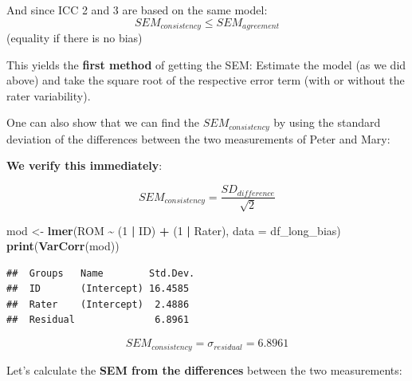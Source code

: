 \documentclass[
]{article}
\newenvironment{Shaded}{\begin{snugshade}}{\end{snugshade}}
\newcommand{\AttributeTok}[1]{\textcolor[rgb]{0.13,0.29,0.53}{#1}}
\newcommand{\CommentTok}[1]{\textcolor[rgb]{0.56,0.35,0.01}{\textit{#1}}}
\newcommand{\DecValTok}[1]{\textcolor[rgb]{0.00,0.00,0.81}{#1}}
\newcommand{\FunctionTok}[1]{\textcolor[rgb]{0.13,0.29,0.53}{\textbf{#1}}}
\newcommand{\NormalTok}[1]{#1}
\newcommand{\OtherTok}[1]{\textcolor[rgb]{0.56,0.35,0.01}{#1}}
\newcommand{\SpecialCharTok}[1]{\textcolor[rgb]{0.81,0.36,0.00}{\textbf{#1}}}
\newcommand{\StringTok}[1]{\textcolor[rgb]{0.31,0.60,0.02}{#1}}
\begin{document}
And since ICC 2 and 3 are based on the same model:
\[SEM_{consistency} \le SEM_{agreement}\]
(equality if there is no bias)

This yields the \textbf{first method} of getting the SEM: Estimate the
model (as we did above) and take the square root of the respective error term
(with or without the rater variability).

One can also show that we can find the \(SEM_{consistency}\) by using
the standard deviation of the differences between the two measurements
of Peter and Mary:

\textbf{We verify this immediately}:

\[SEM_{consistency} = \frac{SD_{difference}}{\sqrt{2}}\]

\begin{Shaded}
\begin{Highlighting}[]
\NormalTok{mod }\OtherTok{\textless{}{-}} \FunctionTok{lmer}\NormalTok{(ROM }\SpecialCharTok{\textasciitilde{}}\NormalTok{ (}\DecValTok{1} \SpecialCharTok{|}\NormalTok{ ID) }\SpecialCharTok{+}\NormalTok{ (}\DecValTok{1} \SpecialCharTok{|}\NormalTok{ Rater), }\AttributeTok{data =}\NormalTok{ df\_long\_bias)}
\FunctionTok{print}\NormalTok{(}\FunctionTok{VarCorr}\NormalTok{(mod))}
\end{Highlighting}
\end{Shaded}

\begin{verbatim}
##  Groups   Name        Std.Dev.
##  ID       (Intercept) 16.4585 
##  Rater    (Intercept)  2.4886 
##  Residual              6.8961
\end{verbatim}

\[SEM_{consistency} = \sigma_{residual} = 6.8961\]

Let's calculate the \textbf{SEM from the differences} between the two measurements:

\begin{Shaded}
\end{Shaded}
\end{document}
